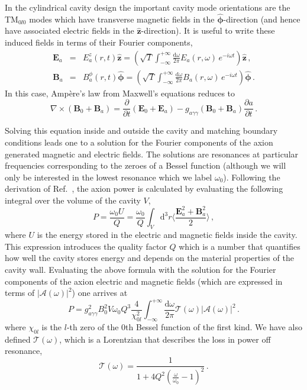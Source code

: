 In the cylindrical cavity design the important cavity mode orientations are the TM$_{0l0}$ modes which have transverse magnetic fields in the $\boldsymbol{\hat{\phi}}$-direction (and hence have associated electric fields in the $\hat{\textbf{z}}$-direction). It is useful to write these induced fields in terms of their Fourier components,
\begin{eqnarray}
\textbf{E}_a &=& E^z_a(r,t)\hat{\textbf{z}} =  \left(\sqrt{T} \int_{-\infty}^{+\infty} \frac{\textrm{d} \omega}{2\pi} E_a(r,\omega) \, e^{-i\omega t} \right) \hat{\textbf{z}} \, , \nonumber \\
\textbf{B}_a &=& B^\phi_a (r,t)\hat{\boldsymbol{\phi}} = \left(\sqrt{T} \int_{-\infty}^{+\infty} \frac{\textrm{d} \omega}{2\pi} B_a(r,\omega) \, e^{-i\omega t} \right) \hat{\boldsymbol{\phi}} \, .\nonumber
\end{eqnarray}
In this case, Amp\`{e}re's law from Maxwell's equations reduces to
\begin{equation}
 \nabla \times (\textbf{B}_0 + \textbf{B}_a) = \frac{\partial}{\partial t}(\textbf{E}_0 + \textbf{E}_a) - g_{a\gamma\gamma} (\textbf{B}_0 + \textbf{B}_a) \frac{\partial a}{\partial t} \, .
\end{equation}

Solving this equation inside and outside the cavity and matching boundary conditions leads one to a solution for the Fourier components of the axion generated magnetic and electric fields. The solutions are resonances at particular frequencies corresponding to the zeroes of a Bessel function (although we will only be interested in the lowest resonance which we label $\omega_0$). Following the derivation of Ref.~\cite{Hong:2014vua}, the axion power is calculated by evaluating the following integral over the volume of the cavity $V$,
\begin{equation}
 P = \frac{\omega_0 U}{Q} = \frac{\omega_0}{Q}\int_V \textrm{d}^3 r \Bigg\langle \frac{\textbf{E}_a^2 + \textbf{B}_a^2}{2}\Bigg\rangle \, ,
\end{equation}
where $U$ is the energy stored in the electric and magnetic fields inside the cavity. This expression introduces the quality factor $Q$ which is a number that quantifies how well the cavity stores energy and depends on the material properties of the cavity wall. Evaluating the above formula with the solution for the Fourier components of the axion electric and magnetic fields (which are expressed in terms of $|\mathcal{A}(\omega)|^2$) one arrives at
\begin{equation}\label{eq:axionpower}
 P = g_{a\gamma\gamma}^2 B_0^2 V\omega_0 Q^3 \frac{4}{\chi_{0l}^2} \int_{-\infty}^{+\infty} \frac{\textrm{d}\omega}{2\pi} \mathcal{T}(\omega)|\mathcal{A}(\omega)|^2 \, .
\end{equation}
where $\chi_{0l}$ is the $l$-th zero of the 0th Bessel function of the first kind. We have also defined $\mathcal{T}(\omega)$, which is a Lorentzian that describes the loss in power off resonance,
\begin{equation}
 \mathcal{T}(\omega) = \frac{1}{1+4Q^2\left(\frac{\omega}{\omega_0} - 1\right)^2} \, .
\end{equation}


